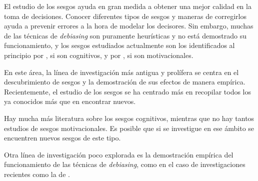 \documentclass[a4paper,11pt]{article}
\begin{document}
El estudio de los sesgos ayuda en gran medida a obtener una mejor calidad en la toma de decisiones. Conocer diferentes tipos de sesgos y maneras de corregirlos ayuda a prevenir errores a la hora de modelar los decisores. Sin embargo, muchas de las técnicas de \textit{debiasing} son puramente heurísticas y no está demostrado su funcionamiento, y los sesgos estudiados actualmente son los identificados al principio por \cite{tversky1974}, si son cognitivos, y por \cite{kunda1990}, si son motivacionales.

En este área, la línea de investigación más antigua y prolífera se centra en el descubrimiento de sesgos y la demostración de sus efectos de manera empírica. Recientemente, el estudio de los sesgos se ha centrado más en recopilar todos los ya conocidos más que en encontrar nuevos. 

Hay mucha más literatura sobre los sesgos cognitivos, mientras que no hay tantos estudios de sesgos motivacionales. Es posible que si se investigue en ese ámbito se encuentren nuevos sesgos de este tipo.

Otra línea de investigación poco explorada es la demostración empírica del funcionamiento de las técnicas de \textit{debiasing}, como en el caso de investigaciones recientes como la de \cite{montibeller2015}.
\end{document}
